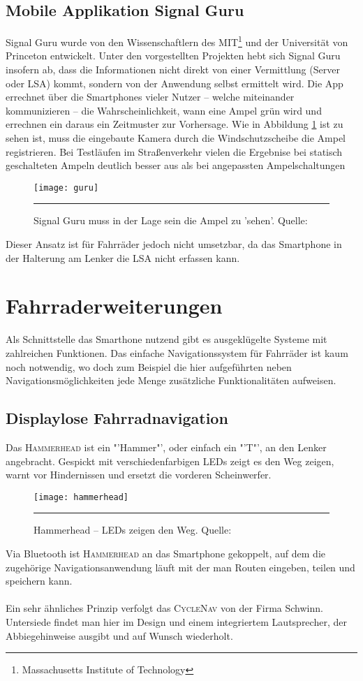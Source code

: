\subsection*{Mobile Applikation Signal Guru}
Signal Guru wurde von den Wissenschaftlern des MIT\footnote{ Massachusetts Institute of Technology} und der Universität von Princeton entwickelt. Unter den vorgestellten Projekten hebt sich Signal Guru insofern ab, dass die Informationen nicht direkt von einer Vermittlung (Server oder \gls{LSA}) kommt, sondern von der Anwendung selbst ermittelt wird. Die \Gls{App} errechnet über die \glspl{Smartphone} vieler Nutzer -- welche miteinander kommunizieren -- die Wahrscheinlichkeit, wann eine Ampel grün wird und errechnen ein daraus ein Zeitmuster zur Vorhersage. Wie in Abbildung \ref{fig:AppSignalGuru} ist zu sehen ist, muss die eingebaute Kamera durch die Windschutzscheibe die Ampel registrieren. Bei Testläufen im Straßenverkehr vielen die Ergebnise bei statisch geschalteten Ampeln deutlich besser aus als bei angepassten Ampelschaltungen \cite{SignalGuruPaper} 
\begin{figure}[H]
    \centering
    \texttt{[image: guru]}
    \rule{35em}{0.5pt}
    \caption[Signal Guru]{Signal Guru muss in der Lage sein die Ampel zu 'sehen'.  Quelle: \cite{SignalGuruPaper}} \label{fig:AppSignalGuru}
\end{figure}
Dieser Ansatz ist für Fahrräder jedoch nicht umsetzbar, da das \gls{Smartphone} in der Halterung am Lenker die \gls{LSA} nicht erfassen kann.
\clearpage
\section{Fahrraderweiterungen}
Als Schnittstelle das Smarthone nutzend gibt es ausgeklügelte Systeme mit zahlreichen Funktionen. Das einfache Navigationssystem für Fahrräder ist kaum noch notwendig, wo doch zum Beispiel die hier aufgeführten neben Navigationsmöglichkeiten jede Menge zusätzliche Funktionalitäten aufweisen.
\subsection{Displaylose Fahrradnavigation}
Das \textsc{Hammerhead} ist ein "'Hammer"', oder einfach ein "'T"', an den Lenker angebracht. Gespickt mit verschiedenfarbigen \glspl{LED} zeigt es den Weg zeigen, warnt vor Hindernissen und ersetzt die vorderen Scheinwerfer.
\begin{figure}[H]
    \centering
    \texttt{[image: hammerhead]}
    \rule{35em}{0.5pt}
    \caption[Hammerhead]{Hammerhead -- \glspl{LED} zeigen den Weg.  Quelle: \cite{Hammerhead}} 
    \label{fig:hammerhead}
\end{figure}
Via Bluetooth ist \textsc{Hammerhead} an das \gls{Smartphone} gekoppelt, auf dem die zugehörige Navigationsanwendung läuft mit der man Routen eingeben, teilen und speichern kann\cite{Hammerhead}.\\\\
Ein sehr ähnliches Prinzip verfolgt das \textsc{CycleNav} von der Firma Schwinn. Untersiede findet man hier im Design und einem integriertem Lautsprecher, der Abbiegehinweise ausgibt und auf Wunsch wiederholt\cite{CycleNav}.
